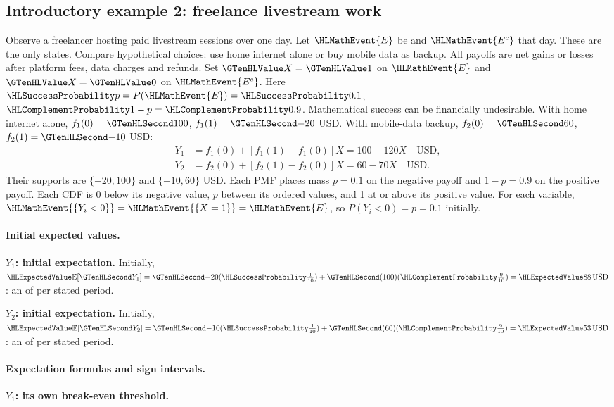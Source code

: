 \clearpage
\subsection{Introductory example 2: freelance livestream work}\label{ex:intro-two}
Observe a freelancer hosting paid livestream sessions over one day. Let $\HLMathEvent{E}$ be 
and $\HLMathEvent{E^c}$  that day. These are the only states. Compare hypothetical choices:
use home internet alone or buy mobile data as backup. All payoffs are net gains or losses
after platform fees, data charges and refunds. Set $\Indicator{X}=\Indicator{1}$ on $\HLMathEvent{E}$ and
$\Indicator{X}=\Indicator{0}$ on $\HLMathEvent{E^c}$. Here $\SuccessProb{p}=P(\HLMathEvent{E})=\SuccessProb{0.1}$,
$\FailureProb{1-p}=\FailureProb{0.9}$. Mathematical success can be financially undesirable.
With home internet alone, $f_1(0)=\Money{100}$, $f_1(1)=\Money{-20}$ USD.
With mobile-data backup, $f_2(0)=\Money{60}$, $f_2(1)=\Money{-10}$ USD:
\[
\begin{aligned}
Y_1&=f_1(0)+[f_1(1)-f_1(0)]X=100-120X\quad\text{USD},\\
Y_2&=f_2(0)+[f_2(1)-f_2(0)]X=60-70X\quad\text{USD}.
\end{aligned}
\]
Their supports are $\{-20,100\}$ and $\{-10,60\}$ USD. Each PMF places
mass $p=0.1$ on the negative payoff and $1-p=0.9$ on the positive payoff.
Each CDF is 0 below its negative value, $p$ between its ordered values,
and 1 at or above its positive value. For each variable,
$\HLMathEvent{\{Y_i<0\}}=\HLMathEvent{\{X=1\}}=\HLMathEvent{E}$, so $P(Y_i<0)=p=0.1$ initially.
\paragraph{Initial expected values.}
\textbf{$Y_1$: initial expectation.}
Initially, $\ExpectedValue{\mathbb E}[\Money{Y_1}]=\Money{-20}(\SuccessProb{\frac{1}{10}})+\Money{(100)}(\FailureProb{\frac{9}{10}})=\ExpectedValue{88\,\text{USD}}$:
an  of  per stated period.

\textbf{$Y_2$: initial expectation.}
Initially, $\ExpectedValue{\mathbb E}[\Money{Y_2}]=\Money{-10}(\SuccessProb{\frac{1}{10}})+\Money{(60)}(\FailureProb{\frac{9}{10}})=\ExpectedValue{53\,\text{USD}}$:
an  of  per stated period.
\paragraph{Expectation formulas and sign intervals.}
\textbf{$Y_1$: its own break-even threshold.}

